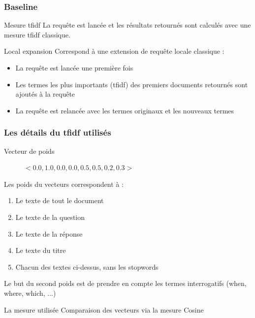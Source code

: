 \documentclass[10pt]{beamer}
\begin{document}
\begin{frame}
  \frametitle{Baseline}

  \begin{block}{Mesure tfidf}
    La requête est lancée et les résultats retournés sont calculés
    avec une mesure tfidf classique.
  \end{block}
  \pause

  \begin{block}{Local expansion}
    Correspond à une extension de requête locale classique :

    \begin{itemize}
    \item La requête est lancée une première fois
    \item Les termes les plus importants (tfidf) des premiers
      documents retournés sont ajoutés à la requête
    \item La requête est relancée avec les termes originaux et les
      nouveaux termes
    \end{itemize}
  \end{block}
\end{frame}

\begin{frame}
  \frametitle{Les détails du tfidf utilisés}

  \begin{block}{Vecteur de poids}
    \begin{figure}[h]
      \centering
      $<0.0, 1.0, 0.0, 0.0, 0.5, 0.5, 0.2, 0.3>$
    \end{figure}
    
    
    Les poids du vecteurs correspondent à :

    \begin{enumerate}
    \item Le texte de tout le document
    \item Le texte de la question
    \item Le texte de la réponse
    \item Le texte du titre
    \item Chacun des textes ci-dessus, sans les stopwords
    \end{enumerate}

    Le but du second poids est de prendre en compte les termes
    interrogatifs (when, where, which, ...)

  \end{block}
  \pause
  \begin{block}{La mesure utilisée}
    Comparaison des vecteurs via la mesure Cosine
  \end{block}

\end{frame}
\end{document}
